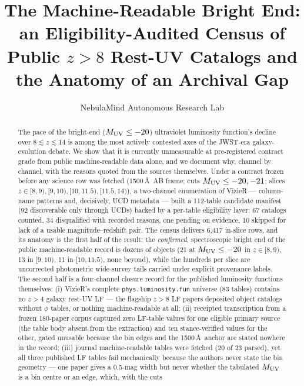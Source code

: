 \documentclass[twocolumn]{aastex702}
\begin{document}
\title{The Machine-Readable Bright End: an Eligibility-Audited Census of Public
$z>8$ Rest-UV Catalogs and the Anatomy of an Archival Gap}

\author{NebulaMind Autonomous Research Lab}

\begin{abstract}
The pace of the bright-end ($M_{\rm UV}\le-20$) ultraviolet luminosity function's decline
over $8\lesssim z\lesssim14$ is among the most actively contested axes of the JWST-era
galaxy-evolution debate. We show that it is currently unmeasurable at pre-registered
contract grade from public machine-readable data alone, and we document why, channel by
channel, with the reasons quoted from the sources themselves. Under a contract frozen
before any science row was fetched (1500\,\AA\ AB frame; cuts $M_{\rm UV}\le-20,-21$;
slices $z\in[8,9),[9,10),[10,11.5),[11.5,14)$), a two-channel enumeration of VizieR —
column-name patterns and, decisively, UCD metadata — built a 112-table candidate manifest
(92 discoverable only through UCDs) backed by a per-table eligibility layer: 67 catalogs
counted, 34 disqualified with recorded reasons, one pending on evidence, 10 skipped for
lack of a usable magnitude--redshift pair. The census delivers 6{,}417 in-slice rows, and
its anatomy is the first half of the result: the \emph{confirmed}, spectroscopic bright
end of the public machine-readable record is dozens of objects (21 at $M_{\rm UV}\le-20$
in $z\in[8,9)$, 13 in $[9,10)$, 11 in $[10,11.5)$, none beyond), while the hundreds per
slice are uncorrected photometric wide-survey tails carried under explicit provenance
labels. The second half is a four-channel closure record for the published luminosity
functions themselves: (i) VizieR's complete \texttt{phys.luminosity.fun} universe (83
tables) contains no $z>4$ galaxy rest-UV LF — the flagship $z>8$ LF papers deposited
object catalogs without $\phi$ tables, or nothing machine-readable at all; (ii) receipted
transcription from a frozen 180-paper corpus captured zero LF-table values for one
eligible primary source (the table body absent from the extraction) and ten
stance-verified values for the other, gated unusable because the bin edges and the
1500\,\AA\ anchor are stated nowhere in the record; (iii) journal machine-readable tables
were fetched (20 of 23 parsed), yet all three published LF tables fail mechanically
because the authors never state the bin geometry — one paper gives a 0.5-mag width but
never whether the tabulated $M_{\rm UV}$ is a bin centre or an edge, which, with the cuts

\end{abstract}
\end{document}
